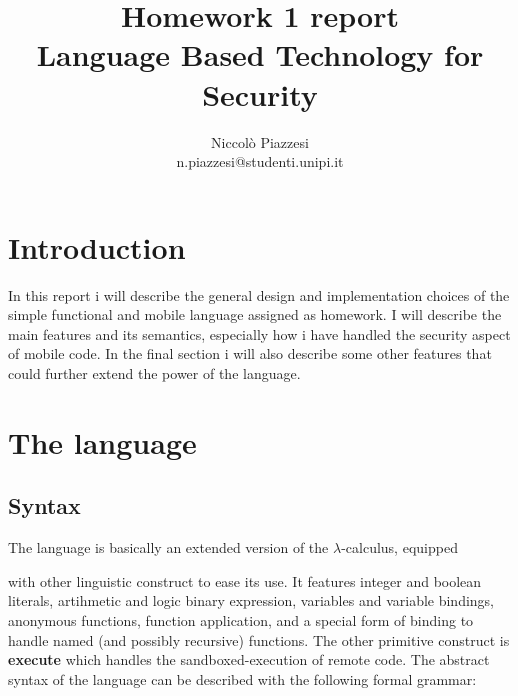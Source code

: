 \documentclass{article}
\begin{document}
    \title{Homework 1 report \\ \large Language Based Technology for Security }
    \author{Niccolò Piazzesi\\n.piazzesi@studenti.unipi.it}
    \maketitle

    \section{Introduction}
    In this report i will describe the general design and implementation choices of  
    the simple functional and mobile language assigned as homework. I will describe the main features  and its semantics, especially how i have handled
    the security aspect of mobile code. In the final section i will also describe some other features that could further extend the power of the language.

    \section{The language}
    \subsection{Syntax}
    The language is basically an extended version of the $\lambda$-calculus, equipped 
    
    with other linguistic construct to ease its use. It features integer and boolean literals,
    artihmetic and logic binary expression, variables and variable bindings, anonymous functions, function application, and a special form of binding to handle named (and possibly recursive) functions.
    The other primitive construct is \textbf{execute} which handles the sandboxed-execution of remote code.
    The abstract syntax of the language can be described with the following formal grammar:
   
\end{document}
